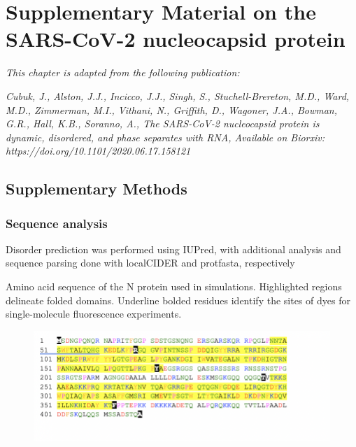\documentclass[../main.tex]{subfiles}
\begin{document}
	
	\graphicspath{{AppendixE/}}
	\chapter{Supplementary Material on the SARS-CoV-2 nucleocapsid protein}
	\label{ch:appendix-e}
	
    \textit{This chapter is adapted from the following publication:}

    \textit{Cubuk, J., Alston, J.J., Incicco, J.J., Singh, S., Stuchell-Brereton, M.D., Ward, M.D., Zimmerman, M.I., Vithani, N., Griffith, D., Wagoner, J.A., Bowman, G.R., Hall, K.B., Soranno, A., The SARS-CoV-2 nucleocapsid protein is dynamic, disordered, and phase separates with RNA, Available on Biorxiv: https://doi.org/10.1101/2020.06.17.158121}\cite{cubuk_sars-cov-2_2020}
	
	\section{Supplementary Methods}
    \subsection{Sequence analysis}
        Disorder prediction was performed using IUPred, with additional analysis and sequence parsing done with localCIDER and protfasta, respectively\cite{Holehouse2020-rl,Dosztanyi2005-bo,Holehouse2017-sx}

        Amino acid sequence of the N protein used in simulations. Highlighted regions delineate folded domains. Underline bolded residues identify the sites of dyes for single-molecule fluorescence experiments.

        \begin{figure}[!htb] %
            \centering
            \includegraphics[width=5.5in]{appendixE-sequence.png}
            \label{fig:appendixE-sequence}
        \end{figure}
\end{document}
